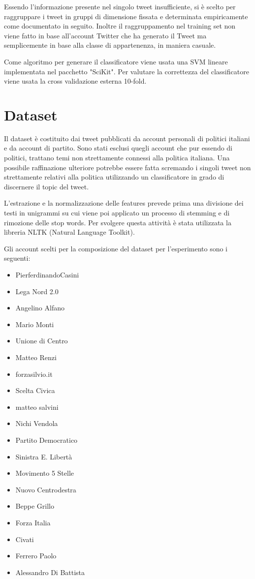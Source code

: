 \documentclass{article}
\begin{document}
Essendo l'informazione presente nel singolo tweet insufficiente, si è scelto per raggruppare i tweet in gruppi di dimensione fissata e determinata empiricamente come documentato in seguito. Inoltre il raggruppamento nel training set non viene fatto in base all'account Twitter che ha generato il Tweet ma semplicemente in base alla classe di appartenenza, in maniera casuale.

Come algoritmo per generare il classificatore viene usata una SVM lineare implementata nel pacchetto "SciKit". Per valutare la correttezza del classificatore viene usata la cross validazione esterna 10-fold.

\section{Dataset}

Il dataset è costituito dai tweet pubblicati da account personali di politici italiani e da account di partito. Sono stati esclusi quegli account che pur essendo di politici, trattano temi non strettamente connessi alla politica italiana. Una possibile raffinazione ulteriore potrebbe essere fatta scremando i singoli tweet non strettamente relativi alla politica utilizzando un classificatore in grado di discernere il topic del tweet. 

L'estrazione e la normalizzazione delle features prevede prima una divisione dei testi in unigrammi su cui viene poi applicato un processo di stemming e di rimozione delle stop words. Per svolgere questa attività è stata utilizzata la libreria NLTK (Natural Language Toolkit).

Gli account scelti per la composizione del dataset per l'esperimento sono i seguenti:

\begin{itemize}
\item PierferdinandoCasini
\item Lega Nord 2.0
\item Angelino Alfano
\item Mario Monti
\item Unione di Centro
\item Matteo Renzi
\item forzasilvio.it
\item Scelta Civica
\item matteo salvini
\item Nichi Vendola
\item Partito Democratico
\item Sinistra E. Libertà
\item Movimento 5 Stelle 
\item Nuovo Centrodestra
\item Beppe Grillo
\item Forza Italia
\item Civati
\item Ferrero Paolo
\item Alessandro Di Battista

\end{itemize}
\end{document}
